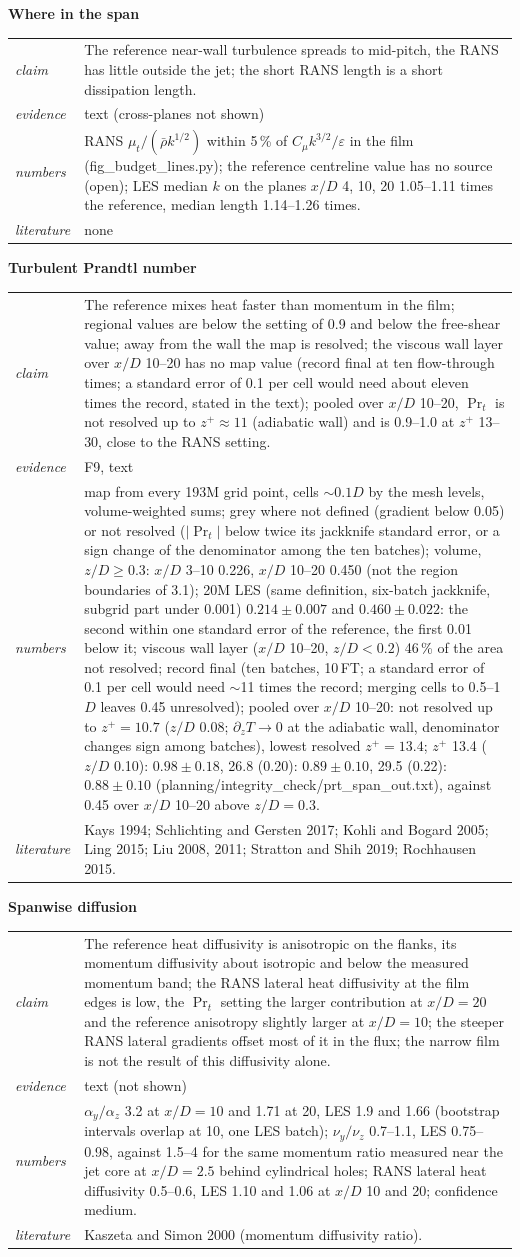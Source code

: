 \documentclass[10pt]{article}
\makeatletter
\newcommand{\blk}[5]{\textbf{#1}\par
\begin{tabularx}{\textwidth}{@{}>{\itshape}l X@{}}
claim & #2\\ evidence & #3\\ numbers & #4\\ literature & #5\\
\end{tabularx}\par\smallskip}
\makeatother
\begin{document}
\blk{Where in the span}{The reference near-wall turbulence spreads to mid-pitch, the RANS has little outside the jet;
the short RANS length is a short dissipation length.}{text (cross-planes not shown)}{RANS
$\mu_t/(\bar\rho k^{1/2})$ within 5\,\% of $C_\mu k^{3/2}/\varepsilon$ in the film (fig\_budget\_lines.py); the
reference centreline value has no source (open); LES median $k$ on the planes $x/D$ 4, 10, 20 1.05--1.11 times
the reference, median length 1.14--1.26 times.}{none}

\blk{Turbulent Prandtl number}{The reference mixes heat faster than momentum in the film; regional values are below
the setting of 0.9 and below the free-shear value; away from the wall the map is resolved; the viscous wall layer
over $x/D$ 10--20 has no map value (record final at ten flow-through times; a standard error of 0.1 per cell
would need about eleven times the record, stated in the text); pooled over $x/D$ 10--20, $\Pr_t$ is not resolved up to $z^+\approx11$
(adiabatic wall) and is 0.9--1.0 at $z^+$ 13--30, close to the RANS setting.}{F9, text}{map from every 193M grid point, cells $\sim0.1D$ by the mesh levels, volume-weighted sums;
grey where not defined (gradient below 0.05) or not resolved ($|\Pr_t|$ below twice its jackknife standard error,
or a sign change of the denominator among the ten batches); volume, $z/D\ge0.3$: $x/D$ 3--10 0.226, $x/D$ 10--20 0.450 (not the region boundaries of 3.1); 20M LES (same definition,
six-batch jackknife, subgrid part under 0.001) $0.214\pm0.007$ and $0.460\pm0.022$: the second within one standard
error of the reference, the first 0.01 below it; viscous wall
layer ($x/D$ 10--20, $z/D<0.2$) 46\,\% of the area not resolved; record final (ten batches, 10\,FT; a standard error of 0.1 per cell
would need $\sim$11 times the record; merging cells to 0.5--1$D$ leaves 0.45 unresolved); pooled over $x/D$
10--20: not resolved up to $z^+=10.7$ ($z/D$ 0.08; $\partial_z T\to0$ at the adiabatic wall, denominator changes
sign among batches), lowest resolved $z^+=13.4$; $z^+$ 13.4 ($z/D$ 0.10): $0.98\pm0.18$, 26.8 (0.20): $0.89\pm0.10$,
29.5 (0.22): $0.88\pm0.10$ (planning/integrity\_check/prt\_span\_out.txt), against 0.45
over $x/D$ 10--20 above $z/D=0.3$.}{Kays 1994; Schlichting and Gersten 2017; Kohli and Bogard 2005; Ling 2015; Liu 2008, 2011; Stratton and
Shih 2019; Rochhausen 2015.}

\blk{Spanwise diffusion}{The reference heat diffusivity is anisotropic on the flanks, its momentum diffusivity about
isotropic and below the measured momentum band; the RANS lateral heat diffusivity at the film edges is low, the
$\Pr_t$ setting the larger contribution at $x/D=20$ and the reference anisotropy slightly larger at $x/D=10$; the
steeper RANS lateral gradients offset most of it in the flux; the narrow film is not the result of this diffusivity
alone.}{text (not shown)}{$\alpha_y/\alpha_z$ 3.2 at $x/D=10$ and 1.71 at 20, LES 1.9 and 1.66 (bootstrap intervals overlap at 10, one LES
batch); $\nu_y/\nu_z$ 0.7--1.1, LES 0.75--0.98, against 1.5--4 for the
same momentum ratio measured near the jet core at $x/D=2.5$ behind cylindrical holes; RANS lateral heat diffusivity 0.5--0.6, LES 1.10 and 1.06 at $x/D$ 10 and 20; confidence
medium.}{Kaszeta and Simon 2000 (momentum diffusivity ratio).}
\end{document}
